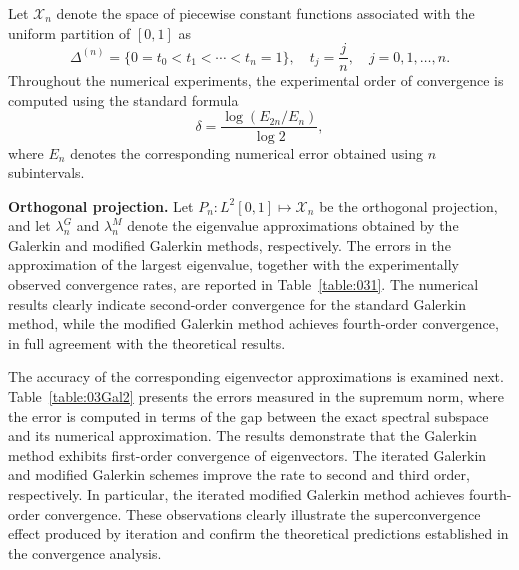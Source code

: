 \documentclass[pdflatex, sn-mathphys-num]{sn-jnl}%
\theoremstyle{thmstyleone}%
\theoremstyle{thmstyletwo}%
\theoremstyle{thmstylethree}%
\begin{document}
Let $\mathcal{X}_{n}$ denote the space of piecewise constant functions associated with the uniform partition of $[0,1]$ as
\[
\Delta^{(n)}=\{0=t_{0}<t_{1}<\cdots<t_{n}=1\}, 
\quad t_{j}=\frac{j}{n}, \quad j=0,1,\dots,n.
\]
Throughout the numerical experiments, the experimental order of convergence is computed using the standard formula
\[
\delta=\frac{\log(E_{2n}/E_{n})}{\log 2},
\]
where $E_{n}$ denotes the corresponding numerical error obtained using $n$ subintervals.

\vspace*{0.2cm}
\noindent 
\textbf{Orthogonal projection.} Let $P_n: L^2[0, 1] \mapsto \mathcal{X}_n$ be the orthogonal projection, and let $\lambda_{n}^{G}$ and $\lambda_{n}^{M}$ denote the eigenvalue approximations obtained by the Galerkin and modified Galerkin methods, respectively. The errors in the approximation of the largest eigenvalue, together with the experimentally observed convergence rates, are reported in Table~\ref{table:031}. The numerical results clearly indicate second-order convergence for the standard Galerkin method, while the modified Galerkin method achieves fourth-order convergence, in full agreement with the theoretical results. 

\noindent
The accuracy of the corresponding eigenvector approximations is examined next.  Table~\ref{table:03Gal2} presents the errors measured in the supremum norm,  where the error is computed in terms of the gap between the exact spectral  subspace and its numerical approximation.  The results demonstrate that the Galerkin method exhibits first-order convergence of eigenvectors. The iterated Galerkin and modified Galerkin schemes improve the rate to second and third order, respectively. In particular, the iterated modified Galerkin method achieves fourth-order convergence. These observations clearly illustrate the superconvergence effect produced by iteration and confirm the theoretical 
predictions established in the convergence analysis.
\end{document}
